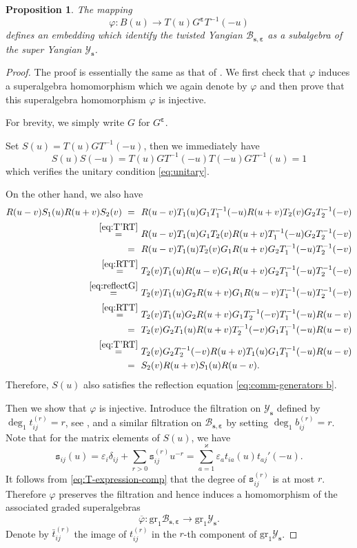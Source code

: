 \documentclass[11pt,reqno]{amsart}
\numberwithin{equation}{section}
\newtheorem{prop}[thm]{Proposition}
\theoremstyle{definition}
\theoremstyle{remark}
\newcommand{\beq}{\begin{equation}}
\newcommand{\eeq}{\end{equation}}
\newcommand{\YMN}{{\mathscr{Y}_{\bm s}}}
\newcommand{\BMN}{{\mathscr{B}_{\bm s,\bm \ve}}}
\newcommand{\ka}{\varkappa}
\newcommand{\ve}{\varepsilon}
\begin{document}
\begin{prop}\label{thm:embedding}
The mapping
\beq\label{eq:emd-b}
\varphi: B(u)\to T(u) G^{\bm\ve}T^{-1}(-u)
\eeq
defines an embedding which identify the twisted Yangian $\mathscr B_{\bm s,\bm\ve}$ as a subalgebra of the super Yangian $\YMN$.
\end{prop}
\begin{proof}
The proof is essentially the same as that of \cite[Theorem 3.1]{Molev2002reflection}. We first check that $\varphi$ induces a superalgebra homomorphism which we again denote by $\varphi$ and then prove that this superalgebra homomorphism $\varphi$ is injective.

For brevity, we simply write $G$ for $G^{\bm\ve}$.

Set $S(u)= T(u) GT^{-1}(-u)$, then we immediately have
$$
S(u)S(-u)=T(u) GT^{-1}(-u)T(-u) GT^{-1}(u)=1
$$
which verifies the unitary condition \eqref{eq:unitary}.

On the other hand, we also have
\begin{align*}
R(u-v)S_1(u)R(u+v)S_2(v)  \ = \ &\ R(u-v)T_1(u)G_1T_1^{-1}(-u)R(u+v)T_2(v)G_2T_2^{-1}(-v)\\
\stackrel{\eqref{eq:T'RT}}{=}  & \
R(u-v)T_1(u)G_1T_2(v)R(u+v)T_1^{-1}(-u)G_2T_2^{-1}(-v)\\
\ =\ & \
R(u-v)T_1(u)T_2(v)G_1R(u+v)G_2T_1^{-1}(-u)T_2^{-1}(-v)\\
\stackrel{\eqref{eq:RTT}}{=}  & \
T_2(v)T_1(u)R(u-v)G_1R(u+v)G_2T_1^{-1}(-u)T_2^{-1}(-v)\\
\stackrel{\eqref{eq:reflectG}}{=}  & \
T_2(v)T_1(u)G_2R(u+v)G_1R(u-v)T_1^{-1}(-u)T_2^{-1}(-v)\\
\stackrel{\eqref{eq:RTT}}{=}  & \
T_2(v)T_1(u)G_2R(u+v)G_1T_2^{-1}(-v)T_1^{-1}(-u)R(u-v)\\
\ =\ & \
T_2(v)G_2T_1(u)R(u+v)T_2^{-1}(-v)G_1T_1^{-1}(-u)R(u-v)\\
\stackrel{\eqref{eq:T'RT}}{=}  & \
T_2(v)G_2T_2^{-1}(-v)R(u+v)T_1(u)G_1T_1^{-1}(-u)R(u-v)\\
\ =\ & \ S_2(v)R(u+v)S_1(u)R(u-v).
\end{align*}
Therefore, $S(u)$ also satisfies the reflection equation \eqref{eq:comm-generators b}.

Then we show that $\varphi$ is injective. Introduce the filtration on $\YMN$ defined by $\deg_1 t_{ij}^{(r)}=r$, see \cite{Gow2007gauss}, and a similar filtration on $\BMN$ by setting $\deg_1 b_{ij}^{(r)}=r$. Note that for the matrix elements of $S(u)$, we have
\beq\label{eq:embed-expl}
\mathtt s_{ij}(u)=\ve_i\delta_{ij}+\sum_{r>0} \mathtt s_{ij}^{(r)}u^{-r}=\sum_{a=1}^\ka \ve_at_{ia}(u)t_{aj}'(-u).
\eeq
It follows from \eqref{eq:T-expression-comp} that the degree of $\mathtt s_{ij}^{(r)}$ is at most $r$. Therefore $\varphi$ preserves the filtration and hence induces a homomorphism of the associated graded superalgebras
$$
\overline{\varphi}:\mathrm{gr}_1\BMN\to \mathrm{gr}_1\YMN.
$$
Denote by $\bar t_{ij}^{(r)}$ the image of $t_{ij}^{(r)}$ in the $r$-th component of $\mathrm{gr}_1\YMN$.


\end{proof}
\end{document}
